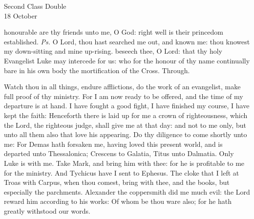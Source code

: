 \begin{inhead}
    {Second Class Double\\
18 October}
\end{inhead}
\par\noindent
{}


\introit
{} honourable are thy friends unto me, O God: right well is their princedom established. \textit{Ps.} O Lord, thou hast searched me out, and known me: thou knowest my down-sitting and mine up-rising.
\collect
 beseech thee, O Lord: that thy holy Evangelist Luke may intercede for us: who for the honour of thy name continually bare in his own body the mortification of the Cross. Through.

 Watch thou in all things, endure afflictions, do the work of an evangelist, make full proof of thy ministry. For I am now ready to be offered, and the time of my departure is at hand. I have fought a good fight, I have finished my course, I have kept the faith: Henceforth there is laid up for me a crown of righteousness, which the Lord, the righteous judge, shall give me at that day: and not to me only, but unto all them also that love his appearing. Do thy diligence to come shortly unto me: For Demas hath forsaken me, having loved this present world, and is departed unto Thessalonica; Crescens to Galatia, Titus unto Dalmatia. Only Luke is with me. Take Mark, and bring him with thee: for he is profitable to me for the ministry. And Tychicus have I sent to Ephesus. The cloke that I left at Troas with Carpus, when thou comest, bring with thee, and the books, but especially the parchments. Alexander the coppersmith did me much evil: the Lord reward him according to his works: Of whom be thou ware also; for he hath greatly withstood our words.

